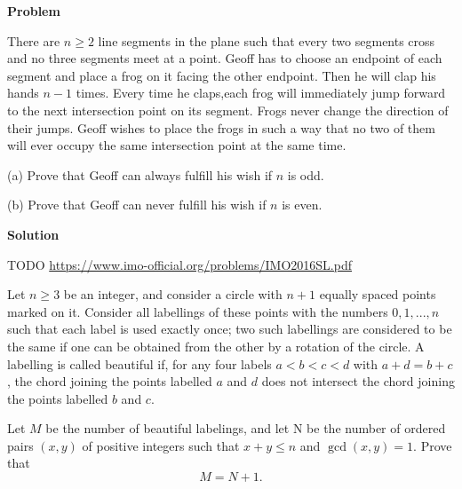 \begin{problem}
[IMO2016PL6]

\textbf{Problem}


There are $n\ge 2$ line segments in the plane such that every two segments cross and no three segments meet at a point. Geoff has to choose an endpoint of each segment and place a frog on it facing the other endpoint. Then he will clap his hands $n-1$ times. Every time he claps,each frog will immediately jump forward to the next intersection point on its segment. Frogs never change the direction of their jumps. Geoff wishes to place the frogs in such a way that no two of them will ever occupy the same intersection point at the same time.

(a) Prove that Geoff can always fulfill his wish if $n$ is odd.

(b) Prove that Geoff can never fulfill his wish if $n$ is even.

\textbf{Solution}

TODO
\url{https://www.imo-official.org/problems/IMO2016SL.pdf}

\end{problem}

\begin{problem}
[IMO2013PL6]
Let $n \ge 3$ be an integer, and consider a circle with $n + 1$ equally spaced points marked on it. Consider all labellings of these points with the numbers $0, 1, ... , n$ such that each label is used exactly once; two such labellings are considered to be the same if one can be obtained from the other by a rotation of the circle. A labelling is called beautiful if, for any four labels $a < b < c < d$ with $a + d = b + c$, the chord joining the points labelled $a$ and $d$ does not intersect the chord joining the points labelled $b$ and $c$.

Let $M$ be the number of beautiful labelings, and let N be the number of ordered pairs $(x, y)$ of positive integers such that $x + y \le n$ and $\gcd(x, y) = 1$. Prove that\[M = N + 1.\]
\end{problem}
%

